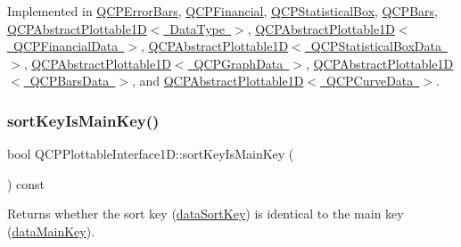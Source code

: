 Implemented in \mbox{\hyperlink{class_q_c_p_error_bars_ad7c727736599dfb173f0952082e1a5b6}{Q\+C\+P\+Error\+Bars}}, \mbox{\hyperlink{class_q_c_p_financial_a3c5beb1ab028a1dba845fc9dcffc7cf4}{Q\+C\+P\+Financial}}, \mbox{\hyperlink{class_q_c_p_statistical_box_a42febad6ad5e924a151434cc434b4ffc}{Q\+C\+P\+Statistical\+Box}}, \mbox{\hyperlink{class_q_c_p_bars_ab03bb6125c3e983b89d694f75ce6b3d5}{Q\+C\+P\+Bars}}, \mbox{\hyperlink{class_q_c_p_abstract_plottable1_d_a22377bf6e57ab7eedbc9e489250c6ded}{Q\+C\+P\+Abstract\+Plottable1\+D$<$ Data\+Type $>$}}, \mbox{\hyperlink{class_q_c_p_abstract_plottable1_d_a22377bf6e57ab7eedbc9e489250c6ded}{Q\+C\+P\+Abstract\+Plottable1\+D$<$ Q\+C\+P\+Financial\+Data $>$}}, \mbox{\hyperlink{class_q_c_p_abstract_plottable1_d_a22377bf6e57ab7eedbc9e489250c6ded}{Q\+C\+P\+Abstract\+Plottable1\+D$<$ Q\+C\+P\+Statistical\+Box\+Data $>$}}, \mbox{\hyperlink{class_q_c_p_abstract_plottable1_d_a22377bf6e57ab7eedbc9e489250c6ded}{Q\+C\+P\+Abstract\+Plottable1\+D$<$ Q\+C\+P\+Graph\+Data $>$}}, \mbox{\hyperlink{class_q_c_p_abstract_plottable1_d_a22377bf6e57ab7eedbc9e489250c6ded}{Q\+C\+P\+Abstract\+Plottable1\+D$<$ Q\+C\+P\+Bars\+Data $>$}}, and \mbox{\hyperlink{class_q_c_p_abstract_plottable1_d_a22377bf6e57ab7eedbc9e489250c6ded}{Q\+C\+P\+Abstract\+Plottable1\+D$<$ Q\+C\+P\+Curve\+Data $>$}}.

\mbox{\label{class_q_c_p_plottable_interface1_d_a229e65e7ab968dd6cd0e259fa504b79d}} 
\subsubsection{\texorpdfstring{sortKeyIsMainKey()}{sortKeyIsMainKey()}}
{\footnotesize\ttfamily bool Q\+C\+P\+Plottable\+Interface1\+D\+::sort\+Key\+Is\+Main\+Key (\begin{DoxyParamCaption}{ }\end{DoxyParamCaption}) const\hspace{0.3cm}{\ttfamily [pure virtual]}}

Returns whether the sort key (\mbox{\hyperlink{class_q_c_p_plottable_interface1_d_afdc92f9f01e7e35f2e96b2ea9dc14ae7}{data\+Sort\+Key}}) is identical to the main key (\mbox{\hyperlink{class_q_c_p_plottable_interface1_d_a2bd60daaac046945fead558cbd83cf73}{data\+Main\+Key}}).

